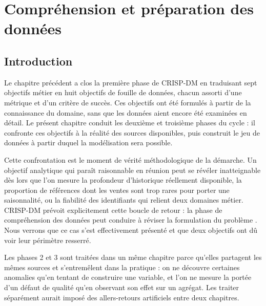 %

\chapter{Compréhension et préparation des données}
\label{chap:donnees}
\minitocsection
\newpage

\section*{Introduction}

Le chapitre précédent a clos la première phase de CRISP-DM en traduisant sept objectifs métier en huit objectifs de fouille de données, chacun assorti d'une métrique et d'un critère de succès. Ces objectifs ont été formulés à partir de la connaissance du domaine, sans que les données aient encore été examinées en détail. Le présent chapitre conduit les deuxième et troisième phases du cycle : il confronte ces objectifs à la réalité des sources disponibles, puis construit le jeu de données à partir duquel la modélisation sera possible.

Cette confrontation est le moment de vérité méthodologique de la démarche. Un objectif analytique qui paraît raisonnable en réunion peut se révéler inatteignable dès lors que l'on mesure la profondeur d'historique réellement disponible, la proportion de références dont les ventes sont trop rares pour porter une saisonnalité, ou la fiabilité des identifiants qui relient deux domaines métier. CRISP-DM prévoit explicitement cette boucle de retour : la phase de compréhension des données peut conduire à réviser la formulation du problème \cite{chapman2000crisp}. Nous verrons que ce cas s'est effectivement présenté et que deux objectifs ont dû voir leur périmètre resserré.

Les phases 2 et 3 sont traitées dans un même chapitre parce qu'elles partagent les mêmes sources et s'entremêlent dans la pratique : on ne découvre certaines anomalies qu'en tentant de construire une variable, et l'on ne mesure la portée d'un défaut de qualité qu'en observant son effet sur un agrégat. Les traiter séparément aurait imposé des allers-retours artificiels entre deux chapitres.

